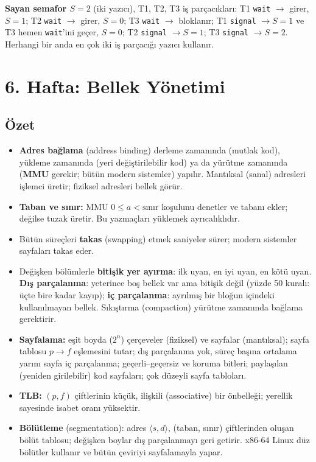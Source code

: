 \documentclass[11pt,a4paper]{article}
\newcommand{\term}[1]{\textbf{\color{mintdeep}#1}}
\begin{document}
\textbf{Sayan semafor $S = 2$} (iki yazıcı), T1, T2, T3 iş parçacıkları: T1 \texttt{wait} $\to$ girer, $S=1$; T2 \texttt{wait} $\to$ girer, $S=0$; T3 \texttt{wait} $\to$ bloklanır; T1 \texttt{signal} $\to S=1$ ve T3 hemen \texttt{wait}'ini geçer, $S=0$; T2 \texttt{signal} $\to S=1$; T3 \texttt{signal} $\to S=2$. Herhangi bir anda en çok iki iş parçacığı yazıcı kullanır.

\section{6. Hafta: Bellek Yönetimi}
\label{sec:w6}
\subsection*{Özet}
\begin{itemize}
  \item \textbf{Adres bağlama} (address binding) derleme zamanında (mutlak kod), yükleme zamanında (yeri değiştirilebilir kod) ya da yürütme zamanında (\term{MMU} gerekir; bütün modern sistemler) yapılır. Mantıksal (sanal) adresleri işlemci üretir; fiziksel adresleri bellek görür.
  \item \textbf{Taban ve sınır:} MMU $0 \le a < \text{sınır}$ koşulunu denetler ve tabanı ekler; değilse tuzak üretir. Bu yazmaçları yüklemek ayrıcalıklıdır.
  \item Bütün süreçleri \textbf{takas} (swapping) etmek saniyeler sürer; modern sistemler sayfaları takas eder.
  \item Değişken bölümlerle \textbf{bitişik yer ayırma}: ilk uyan, en iyi uyan, en kötü uyan. \term{Dış parçalanma}: yeterince boş bellek var ama bitişik değil (yüzde 50 kuralı: üçte bire kadar kayıp); \term{iç parçalanma}: ayrılmış bir bloğun içindeki kullanılmayan bellek. Sıkıştırma (compaction) yürütme zamanında bağlama gerektirir.
  \item \textbf{Sayfalama:} eşit boyda ($2^{n}$) çerçeveler (fiziksel) ve sayfalar (mantıksal); sayfa tablosu $p \to f$ eşlemesini tutar; dış parçalanma yok, süreç başına ortalama yarım sayfa iç parçalanma; geçerli--geçersiz ve koruma bitleri; paylaşılan (yeniden girilebilir) kod sayfaları; çok düzeyli sayfa tabloları.
  \item \textbf{TLB:} $(p, f)$ çiftlerinin küçük, ilişkili (associative) bir önbelleği; yerellik sayesinde isabet oranı yüksektir.
  \item \textbf{Bölütleme} (segmentation): adres $\langle s, d\rangle$, (taban, sınır) çiftlerinden oluşan bölüt tablosu; değişken boylar dış parçalanmayı geri getirir. x86-64 Linux düz bölütler kullanır ve bütün çeviriyi sayfalamayla yapar.
\end{itemize}
\end{document}
